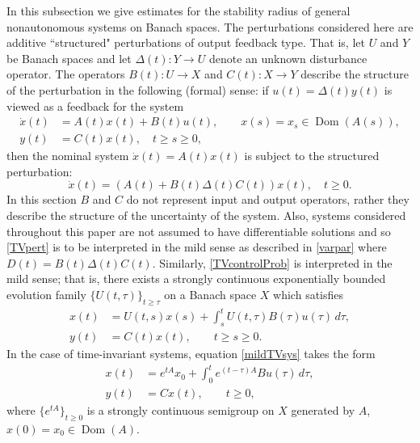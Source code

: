 \documentclass[10pt,psamsfonts,leqno]{siamltex}
\newcommand{\Dom}{\operatorname{Dom}}
\renewcommand{\t}{\tau}
\newcommand{\lb}{\label}
\begin{document}
In this subsection we give estimates for the stability radius of general
nonautonomous systems on Banach spaces. The perturbations considered
here are additive ``structured" perturbations of output feedback type.
That is, let $U$ and $Y$ be Banach spaces and let $\Delta(t): Y\to U$
denote an unknown disturbance operator.  The operators $B(t):U\to X$ and
$C(t):X\to Y$  describe the structure of the perturbation in the
following (formal) sense:  if $u(t)=\Delta(t)y(t)$ is viewed as a
feedback for the system
\begin{equation}\label{TVcontrolProb}
\begin{aligned}
\dot x(t)&=A(t)x(t)+B(t)u(t),\qquad x(s)=x_s\in \Dom(A(s)),\\
y(t)&=C(t)x(t),\quad t\ge s\ge0,
\end{aligned}
\end{equation}
then the nominal system $\dot x(t)=A(t)x(t)$ is subject to the
structured perturbation:
\begin{equation}\label{TVpert}
\dot x(t)=(A(t)+B(t)\Delta(t)C(t))x(t),\quad t\ge 0.
\end{equation}
In this section $B$ and $C$ do not represent input and output operators,
rather they describe the structure of the uncertainty of the system.
Also, systems considered throughout this paper are not assumed to have
differentiable solutions and so
\eqref{TVpert} is to be interpreted in the mild sense as described in
\eqref{varpar} where $D(t)=B(t)\Delta(t)C(t)$.  Similarly,
\eqref{TVcontrolProb} is interpreted in the mild sense; that is, there
exists a strongly continuous exponentially bounded evolution family
$\{U(t,\tau)\}_{t\ge\tau}$ on a Banach space $X$ which satisfies
\begin{equation}\lb{mildTVsys}
\begin{aligned}
x(t)&=U(t,s)x(s)+
\int_s^tU(t,\tau)B(\tau)u(\tau)\,d\tau,
\\ y(t)&=C(t)x(t), \qquad t\ge s\ge 0.
\end{aligned}
\end{equation}
In the case of  time-invariant systems, equation \eqref{mildTVsys} takes
the form
\begin{equation}\lb{mildAUTsys}
\begin{aligned}
x(t)&=e^{tA}x_0+\int_0^te^{(t-\t)A}Bu(\t)\,d\t,\\
y(t)&=Cx(t), \qquad  t\ge 0,
\end{aligned}
\end{equation}
where $\{e^{tA}\}_{t\ge0}$ is a strongly
continuous semigroup on $X$ generated by $A$, $x(0)=x_0\in\Dom(A)$.
\end{document}
